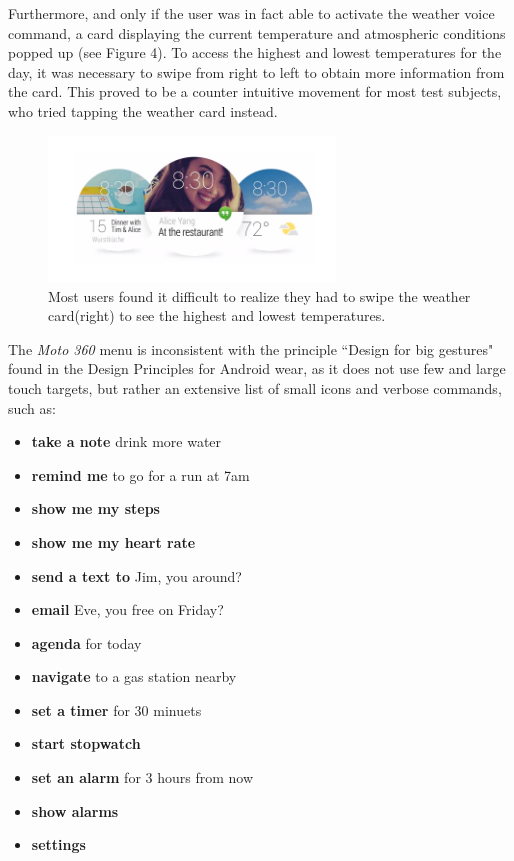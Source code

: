 \documentclass[11pt,a4paper]{scrartcl}
\begin{document}
Furthermore, and only if the user was in fact able to activate the weather voice command, a card displaying the current temperature and atmospheric conditions popped up (see Figure 4). To access the highest and lowest temperatures for the day, it was necessary to swipe from right to left to obtain more information from the card. This proved to be a counter intuitive movement for most test subjects, who tried tapping the weather card instead.

\begin{figure}[h]
\centering
\includegraphics[width=3in]{moto_cards.png}
\caption{Most users found it difficult to realize they had to swipe the weather card(right) to see the highest and lowest temperatures.}
\end{figure}

The \textit{Moto 360} menu is inconsistent with the principle ``Design for big gestures"\cite{moto360} found in the Design Principles for Android wear, as it does not use few and large touch targets, but rather an extensive list of small icons and verbose commands, such as:
\begin{itemize}
	\item \textbf{take a note} drink more water
	\item \textbf{remind me} to go for a run at 7am
	\item \textbf{show me my steps}
	\item \textbf{show me my heart rate}
	\item \textbf{send a text to} Jim, you around?
	\item \textbf{email} Eve, you free on Friday?
	\item \textbf{agenda} for today
	\item \textbf{navigate} to a gas station nearby
	\item \textbf{set a timer} for 30 minuets
	\item \textbf{start stopwatch}
	\item \textbf{set an alarm} for 3 hours from now
	\item \textbf{show alarms}
	\item \textbf{settings}
\end{itemize}
\end{document}
